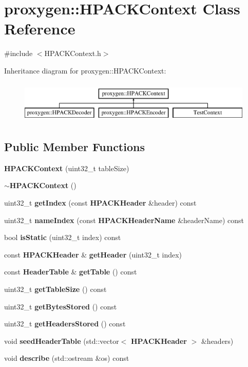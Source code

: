 \section{proxygen\+:\+:H\+P\+A\+C\+K\+Context Class Reference}
\label{classproxygen_1_1HPACKContext}


{\ttfamily \#include $<$H\+P\+A\+C\+K\+Context.\+h$>$}

Inheritance diagram for proxygen\+:\+:H\+P\+A\+C\+K\+Context\+:\begin{figure}[H]
\begin{center}
\leavevmode
\includegraphics[height=2.000000cm]{classproxygen_1_1HPACKContext}
\end{center}
\end{figure}
\subsection*{Public Member Functions}
\begin{DoxyCompactItemize}
\item 
{\bf H\+P\+A\+C\+K\+Context} (uint32\+\_\+t table\+Size)
\item 
{\bf $\sim$\+H\+P\+A\+C\+K\+Context} ()
\item 
uint32\+\_\+t {\bf get\+Index} (const {\bf H\+P\+A\+C\+K\+Header} \&header) const 
\item 
uint32\+\_\+t {\bf name\+Index} (const {\bf H\+P\+A\+C\+K\+Header\+Name} \&header\+Name) const 
\item 
bool {\bf is\+Static} (uint32\+\_\+t index) const 
\item 
const {\bf H\+P\+A\+C\+K\+Header} \& {\bf get\+Header} (uint32\+\_\+t index)
\item 
const {\bf Header\+Table} \& {\bf get\+Table} () const 
\item 
uint32\+\_\+t {\bf get\+Table\+Size} () const 
\item 
uint32\+\_\+t {\bf get\+Bytes\+Stored} () const 
\item 
uint32\+\_\+t {\bf get\+Headers\+Stored} () const 
\item 
void {\bf seed\+Header\+Table} (std\+::vector$<$ {\bf H\+P\+A\+C\+K\+Header} $>$ \&headers)
\item 
void {\bf describe} (std\+::ostream \&os) const 
\end{DoxyCompactItemize}
